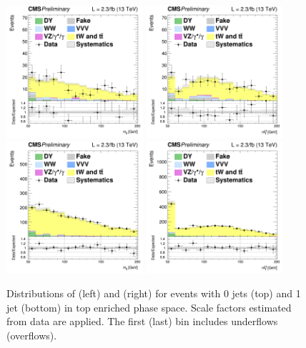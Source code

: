 \begin{figure}[htb]
\centering
\includegraphics[width=0.45\textwidth]{images/13TeV/cratio_hww2l2v_13TeV_top_of0j_mll.png}
\includegraphics[width=0.45\textwidth]{images/13TeV/cratio_hww2l2v_13TeV_top_of0j_mth.png}
\includegraphics[width=0.45\textwidth]{images/13TeV/cratio_hww2l2v_13TeV_top_of1j_mll.png}
\includegraphics[width=0.45\textwidth]{images/13TeV/cratio_hww2l2v_13TeV_top_of1j_mth.png}
\caption{
Distributions of \mll (left) and \mt (right) for events with 0 jets (top) and 1 jet (bottom) 
in top enriched phase space.
Scale factors estimated from data are applied. The first (last) bin includes underflows (overflows).
}
\label{fig:TopCtrl125}
\end{figure}

